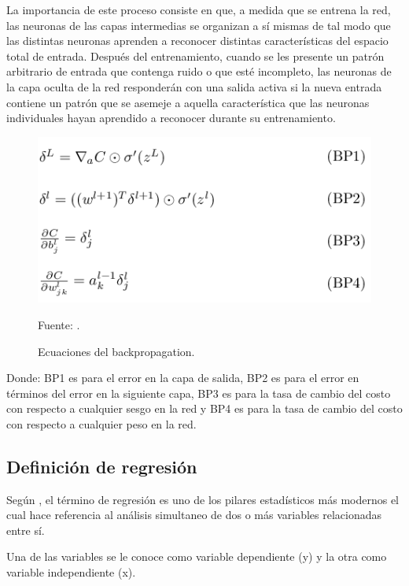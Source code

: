 La importancia de este proceso consiste en que, a medida que se entrena la red, las neuronas de las capas intermedias se organizan a sí mismas de tal modo que las distintas neuronas aprenden a reconocer distintas características del espacio total de entrada. Después del entrenamiento, cuando se les presente un patrón arbitrario de entrada que contenga ruido o que esté incompleto, las neuronas de la capa oculta de la red responderán con una salida activa si la nueva entrada contiene un patrón que se asemeje a aquella característica que las neuronas individuales hayan aprendido a reconocer durante su entrenamiento.

\begin{figure}[h!]
	\centering
		\includegraphics[scale=0.7]{imagenes/ecuacionesBackpropagation.png}
		\caption{Ecuaciones del backpropagation.}
		\begin{center}
    Fuente: \cite{ecuBack}.
    \end{center}
	\label{Fig:ecuacionesBackpropagation}
\end{figure}

Donde: BP1 es para el error en la capa de salida, BP2 es para el error en términos del error en la siguiente capa, BP3 es para la tasa de cambio del costo con respecto a cualquier sesgo en la red y BP4 es para la tasa de cambio del costo con respecto a cualquier peso en la red.

\subsection{Definición de regresión }
Según \cite{pat2013introduccion}, el término de regresión es uno de los pilares estadísticos más modernos el cual hace referencia al análisis simultaneo de dos o más variables relacionadas entre sí.

Una de las variables se le conoce como variable dependiente (y) y la otra como variable independiente (x).

